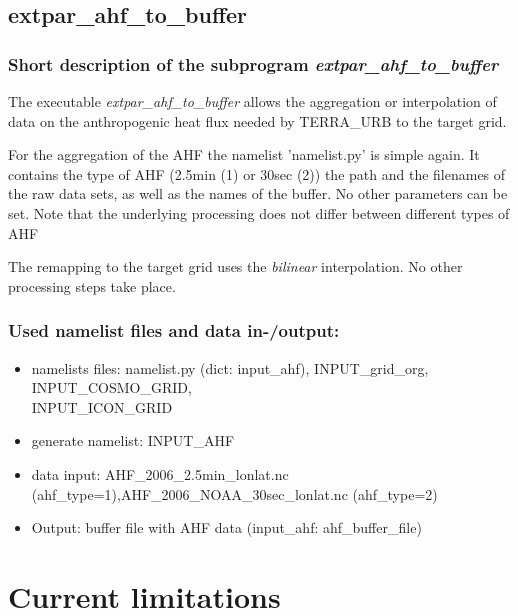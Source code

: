 \documentclass[a4paper,10pt,DIV14,BCOR1cm,titlepage,twoside]{scrartcl}
\begin{document}
\subsection{extpar\_ahf\_to\_buffer}\label{extpar_ahf_to_buffer}
\subsubsection{Short description of the subprogram \textit{extpar\_ahf\_to\_buffer}}
The executable \textit{extpar\_ahf\_to\_buffer} allows the aggregation or interpolation of data on the anthropogenic heat flux needed by TERRA\_URB to the target grid. \par\medskip\noindent
For the aggregation of the AHF the namelist 'namelist.py' is simple again. It contains the type of AHF (2.5min (1) or 30sec (2)) the path and the filenames of the raw data sets, as well as the names of the buffer. No other parameters can be set. Note that the underlying processing does not differ between different types of AHF \par\medskip\noindent
The remapping to the target grid uses the \textit{bilinear} interpolation. No other processing steps take place. 

\subsubsection{Used namelist files and data in-/output:}
\begin{itemize}
 \item namelists files: namelist.py (dict: input\_ahf), INPUT\_grid\_org, INPUT\_COSMO\_GRID, \\
       INPUT\_ICON\_GRID
 \item generate namelist: INPUT\_AHF
 \item data input: AHF\_2006\_2.5min\_lonlat.nc (ahf\_type=1),AHF\_2006\_NOAA\_30sec\_lonlat.nc (ahf\_type=2)
 \item Output: buffer file with AHF data (input\_ahf: ahf\_buffer\_file)
\end{itemize}

\section{Current limitations}
\end{document}
